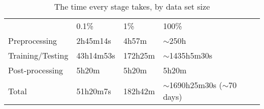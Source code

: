 \begin{table}[htbp]
	\centering
	\caption{The time every stage takes, by data set size}\label{tab:times_taken}
	\begin{tabular}{llll}
										  & 0.1\%     & 1\%     & 100\%             \\ \cline{2-4} 
	\multicolumn{1}{l|}{Preprocessing}    & 2h45m14s  & 4h57m   & \(\sim\)250h        \\
	\multicolumn{1}{l|}{Training/Testing} & 43h14m53s & 172h25m & \(\sim\)1435h5m30s \\
	\multicolumn{1}{l|}{Post-processing}      & 5h20m     & 5h20m   & 5h20m             \\
	\multicolumn{1}{l|}{Total}            & 51h20m7s  & 182h42m & \(\sim\)1690h25m30s (\(\sim\)70 days)
	\end{tabular}
\end{table}